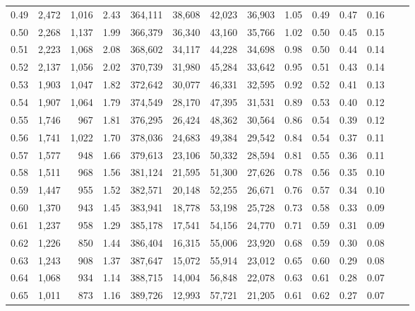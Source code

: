 \begin{tabular}{rrrrrrrrrrrrrr}
0.49 &   2,472 &  1,016 &    2.43 &  364,111 &   38,608 &  42,023 &  36,903 &  1.05 &  0.49 &  0.47 &      0.16 \\
0.50 &   2,268 &  1,137 &    1.99 &  366,379 &   36,340 &  43,160 &  35,766 &  1.02 &  0.50 &  0.45 &      0.15 \\
0.51 &   2,223 &  1,068 &    2.08 &  368,602 &   34,117 &  44,228 &  34,698 &  0.98 &  0.50 &  0.44 &      0.14 \\
0.52 &   2,137 &  1,056 &    2.02 &  370,739 &   31,980 &  45,284 &  33,642 &  0.95 &  0.51 &  0.43 &      0.14 \\
0.53 &   1,903 &  1,047 &    1.82 &  372,642 &   30,077 &  46,331 &  32,595 &  0.92 &  0.52 &  0.41 &      0.13 \\
0.54 &   1,907 &  1,064 &    1.79 &  374,549 &   28,170 &  47,395 &  31,531 &  0.89 &  0.53 &  0.40 &      0.12 \\
0.55 &   1,746 &    967 &    1.81 &  376,295 &   26,424 &  48,362 &  30,564 &  0.86 &  0.54 &  0.39 &      0.12 \\
0.56 &   1,741 &  1,022 &    1.70 &  378,036 &   24,683 &  49,384 &  29,542 &  0.84 &  0.54 &  0.37 &      0.11 \\
0.57 &   1,577 &    948 &    1.66 &  379,613 &   23,106 &  50,332 &  28,594 &  0.81 &  0.55 &  0.36 &      0.11 \\
0.58 &   1,511 &    968 &    1.56 &  381,124 &   21,595 &  51,300 &  27,626 &  0.78 &  0.56 &  0.35 &      0.10 \\
0.59 &   1,447 &    955 &    1.52 &  382,571 &   20,148 &  52,255 &  26,671 &  0.76 &  0.57 &  0.34 &      0.10 \\
0.60 &   1,370 &    943 &    1.45 &  383,941 &   18,778 &  53,198 &  25,728 &  0.73 &  0.58 &  0.33 &      0.09 \\
0.61 &   1,237 &    958 &    1.29 &  385,178 &   17,541 &  54,156 &  24,770 &  0.71 &  0.59 &  0.31 &      0.09 \\
0.62 &   1,226 &    850 &    1.44 &  386,404 &   16,315 &  55,006 &  23,920 &  0.68 &  0.59 &  0.30 &      0.08 \\
0.63 &   1,243 &    908 &    1.37 &  387,647 &   15,072 &  55,914 &  23,012 &  0.65 &  0.60 &  0.29 &      0.08 \\
0.64 &   1,068 &    934 &    1.14 &  388,715 &   14,004 &  56,848 &  22,078 &  0.63 &  0.61 &  0.28 &      0.07 \\
0.65 &   1,011 &    873 &    1.16 &  389,726 &   12,993 &  57,721 &  21,205 &  0.61 &  0.62 &  0.27 &      0.07 \\

\end{tabular}

